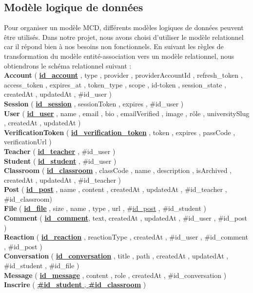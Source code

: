 \subsection{Modèle logique de données}
Pour organiser un modèle MCD, différents modèles logiques de données peuvent être utilisés. Dans notre projet, nous avons choisi d'utiliser le modèle relationnel car il répond bien à nos besoins non fonctionnels. En suivant les règles de transformation du modèle entité-association vers un modèle relationnel, nous obtiendrons le schéma relationnel suivant : \\
\textbf{Account} ( \textbf{\uline{id\_account}} , type , provider , providerAccountId , refresh\_token , access\_token , expires\_at , token\_type , scope , id-token , session\_state , createdAt , updatedAt , \#id\_user ) \\
\textbf{Session} ( \textbf{\uline{id\_session}} , sessionToken , expires , \#id\_user ) \\ 
\textbf{User} ( \textbf{\uline{id\_user}} , name , email , bio , emailVerified , image , rôle , universitySlug , createdAt , updatedAt ) \\
\textbf{VerificationToken} ( \textbf{\uline{id\_verification\_token}} , token , expires , passCode , verificationUrl ) \\
\textbf{Teacher} ( \textbf{\uline{id\_teacher}} , \#id\_user ) \\
\textbf{Student} ( \textbf{\uline{id\_student}} , \#id\_user ) \\
\textbf{Classroom} ( \textbf{\uline{id\_classroom}} , classCode , name , description , isArchived , createdAt , updatedAt , \#id\_teacher ) \\
\textbf{Post} ( \textbf{\uline{id\_post}} , name , content , createdAt , updatedAt , \#id\_teacher , \#id\_classroom) \\
\textbf{File} ( \textbf{\uline{id\_file}} , size , name , type , url , \#\uline{id\_post} , \#id\_student ) \\
\textbf{Comment} ( \textbf{\uline{id\_comment}}, text, createdAt , updatedAt , \#id\_user , \#id\_post ) \\
\textbf{Reaction} ( \textbf{\uline{id\_reaction}} , reactionType , createdAt , \#id\_user , \#id\_comment , \#id\_post ) \\
\textbf{Conversation} ( \textbf{\uline{id\_conversation}} , title , path , createdAt , updatedAt , \#id\_student , \#id\_file ) \\
\textbf{Message} ( \textbf{\uline{id\_message}} , content , role , createdAt , \#id\_conversation ) \\
\textbf{Inscrire} ( \uline{\textbf{\#id\_student} , \textbf{\#id\_classroom}} )

